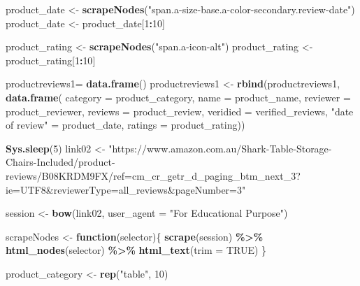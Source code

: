 \documentclass[
]{article}
\newenvironment{Shaded}{\begin{snugshade}}{\end{snugshade}}
\newcommand{\AttributeTok}[1]{\textcolor[rgb]{0.13,0.29,0.53}{#1}}
\newcommand{\ConstantTok}[1]{\textcolor[rgb]{0.56,0.35,0.01}{#1}}
\newcommand{\ControlFlowTok}[1]{\textcolor[rgb]{0.13,0.29,0.53}{\textbf{#1}}}
\newcommand{\DecValTok}[1]{\textcolor[rgb]{0.00,0.00,0.81}{#1}}
\newcommand{\FunctionTok}[1]{\textcolor[rgb]{0.13,0.29,0.53}{\textbf{#1}}}
\newcommand{\NormalTok}[1]{#1}
\newcommand{\OtherTok}[1]{\textcolor[rgb]{0.56,0.35,0.01}{#1}}
\newcommand{\SpecialCharTok}[1]{\textcolor[rgb]{0.81,0.36,0.00}{\textbf{#1}}}
\newcommand{\StringTok}[1]{\textcolor[rgb]{0.31,0.60,0.02}{#1}}
\begin{document}
\begin{Shaded}
\begin{Highlighting}[]
\NormalTok{  product\_date }\OtherTok{\textless{}{-}} \FunctionTok{scrapeNodes}\NormalTok{(}\StringTok{"span.a{-}size{-}base.a{-}color{-}secondary.review{-}date"}\NormalTok{)}
\NormalTok{  product\_date }\OtherTok{\textless{}{-}}\NormalTok{ product\_date[}\DecValTok{1}\SpecialCharTok{:}\DecValTok{10}\NormalTok{]}
  
\NormalTok{  product\_rating }\OtherTok{\textless{}{-}} \FunctionTok{scrapeNodes}\NormalTok{(}\StringTok{"span.a{-}icon{-}alt"}\NormalTok{)}
\NormalTok{  product\_rating }\OtherTok{\textless{}{-}}\NormalTok{ product\_rating[}\DecValTok{1}\SpecialCharTok{:}\DecValTok{10}\NormalTok{]}
  
\NormalTok{  productreviews1}\OtherTok{=} \FunctionTok{data.frame}\NormalTok{()}
\NormalTok{  productreviews1 }\OtherTok{\textless{}{-}} \FunctionTok{rbind}\NormalTok{(productreviews1, }\FunctionTok{data.frame}\NormalTok{(}
                      \AttributeTok{category =}\NormalTok{ product\_category,}
                      \AttributeTok{name =}\NormalTok{ product\_name,}
                      \AttributeTok{reviewer =}\NormalTok{ product\_reviewer,}
                      \AttributeTok{reviews =}\NormalTok{ product\_review,}
                      \AttributeTok{veridied =}\NormalTok{ verified\_reviews,}
                      \StringTok{"date of review"} \OtherTok{=}\NormalTok{ product\_date,}
                      \AttributeTok{ratings =}\NormalTok{ product\_rating))}

  
 \FunctionTok{Sys.sleep}\NormalTok{(}\DecValTok{5}\NormalTok{)}
\NormalTok{link02 }\OtherTok{\textless{}{-}} \StringTok{"https://www.amazon.com.au/Shark{-}Table{-}Storage{-}Chairs{-}Included/product{-}reviews/B08KRDM9FX/ref=cm\_cr\_getr\_d\_paging\_btm\_next\_3?ie=UTF8\&reviewerType=all\_reviews\&pageNumber=3"}


\NormalTok{  session }\OtherTok{\textless{}{-}} \FunctionTok{bow}\NormalTok{(link02,}
               \AttributeTok{user\_agent =} \StringTok{"For Educational Purpose"}\NormalTok{)}

\NormalTok{  scrapeNodes }\OtherTok{\textless{}{-}} \ControlFlowTok{function}\NormalTok{(selector)\{}
    \FunctionTok{scrape}\NormalTok{(session) }\SpecialCharTok{\%\textgreater{}\%}
      \FunctionTok{html\_nodes}\NormalTok{(selector) }\SpecialCharTok{\%\textgreater{}\%}
      \FunctionTok{html\_text}\NormalTok{(}\AttributeTok{trim =} \ConstantTok{TRUE}\NormalTok{)}
\NormalTok{  \}}

\NormalTok{  product\_category }\OtherTok{\textless{}{-}} \FunctionTok{rep}\NormalTok{(}\StringTok{"table"}\NormalTok{, }\DecValTok{10}\NormalTok{)}


\end{Highlighting}
\end{Shaded}
\end{document}
